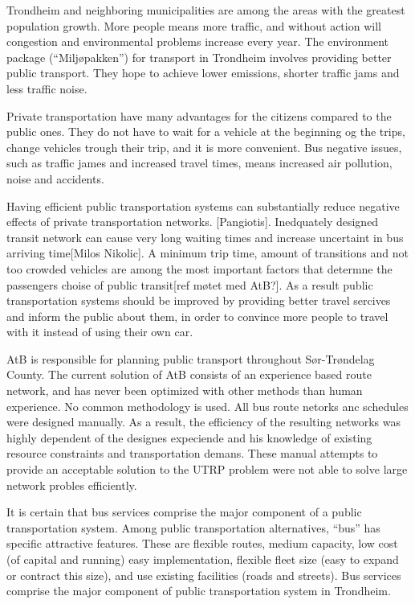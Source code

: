 Trondheim and neighboring municipalities are among the areas with the greatest population growth. More people means more traffic, and without action will congestion and environmental problems increase every year. The environment package (“Miljøpakken”) for transport in Trondheim involves providing better public transport. They hope to achieve lower emissions, shorter traffic jams and less traffic noise.

Private transportation have many advantages for the citizens compared to the public ones. They do not have to wait for a vehicle at the beginning og the trips, change vehicles trough their trip, and it is more convenient. Bus negative issues, such as traffic james and increased travel times, means increased air pollution, noise and accidents. 

Having efficient public transportation systems can substantially reduce negative effects of private transportation networks. [Pangiotis].  Inedquately designed transit network can cause very long waiting times and increase uncertaint in bus arriving time[Milos Nikolic]. A minimum trip time, amount of transitions and not too crowded vehicles are among the most important factors that determne the passengers choise of public transit[ref møtet med AtB?]. As a result public transportation systems should be improved by providing better travel sercives and inform the public about them, in order to convince more people to travel with it instead of using their own car. 

AtB is responsible for planning public transport throughout Sør-Trøndelag County. The current solution of AtB consists of an experience based route network, and has never been optimized with other methods than human experience.  No common methodology is used. All bus route netorks anc schedules were designed manually. As a result, the efficiency of the resulting networks was highly dependent of the designes expeciende and his knowledge of existing resource constraints and transportation demans. These manual attempts to provide an acceptable solution to the UTRP problem were not able to solve large network probles efficiently. 

It is certain that bus services comprise the major component of a public transportation system. Among public transportation alternatives, “bus” has specific attractive features. These are flexible routes, medium capacity, low cost (of capital and running) easy implementation, flexible fleet size (easy to expand or contract this size), and use existing facilities (roads and streets). Bus services comprise the major component of public transportation system in Trondheim.

